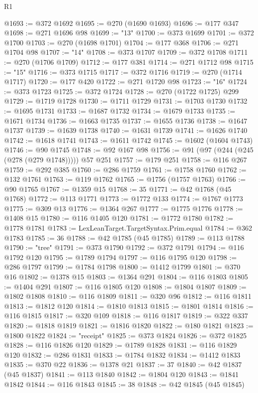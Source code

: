 \begin{lexlean}{R1}
\begin{coremodule}
@1693 := @372 @1692
@1695 := @270 (@1690 @1693)
@1696 := @177 @347
@1698 := @271 @1696 @98
@1699 := "13"
@1700 := @373 @1699
@1701 := @372 @1700
@1703 := @270 (@1698 @1701)
@1704 := @177 @368
@1706 := @271 @1704 @98
@1707 := "14"
@1708 := @373 @1707
@1709 := @372 @1708
@1711 := @270 (@1706 @1709)
@1712 := @177 @381
@1714 := @271 @1712 @98
@1715 := "15"
@1716 := @373 @1715
@1717 := @372 @1716
@1719 := @270 (@1714 @1717)
@1720 := @177 @420
@1722 := @271 @1720 @98
@1723 := "16"
@1724 := @373 @1723
@1725 := @372 @1724
@1728 := @270 (@1722 @1725) @299
@1729 := @1719 @1728
@1730 := @1711 @1729
@1731 := @1703 @1730
@1732 := @1695 @1731
@1733 := @1687 @1732
@1734 := @1679 @1733
@1735 := @1671 @1734
@1736 := @1663 @1735
@1737 := @1655 @1736
@1738 := @1647 @1737
@1739 := @1639 @1738
@1740 := @1631 @1739
@1741 := @1626 @1740
@1742 := @1618 @1741
@1743 := @1611 @1742
@1745 := @1602 (@1604 @1743)
@1746 := @90 @1745
@1748 := @92 @167 @98
@1756 := @91 (@97 (@244 (@245 (@278 (@279 @1748))))) @57 @251
@1757 := @179 @251
@1758 := @116 @267
@1759 := @292 @385
@1760 := @286 @1759
@1761 := @1758 @1760
@1762 := @132 @1761
@1763 := @119 @1762
@1765 := @1756 (@1757 @1763)
@1766 := @90 @1765
@1767 := @1359 @15
@1768 := 35
@1771 := @42 @1768 (@45 @1768)
@1772 := @113 @1771
@1773 := @1772 @133
@1774 := @1767 @1773
@1775 := @309 @13
@1776 := @1364 @267
@1777 := @1775 @1776
@1778 := @1408 @15
@1780 := @116 @1405 @120
@1781 := @1772 @1780
@1782 := @1778 @1781
@1783 := LexLeanTarget.TargetSyntax.Prim.equal
@1784 := @362 @1783
@1785 := 36
@1788 := @42 @1785 (@45 @1785)
@1789 := @113 @1788
@1790 := "tree"
@1791 := @373 @1790
@1792 := @372 @1791
@1794 := @116 @1792 @120
@1795 := @1789 @1794
@1797 := @116 @1795 @120
@1798 := @286 @1797
@1799 := @1784 @1798
@1800 := @1412 @1799
@1801 := @370 @16
@1802 := @1378 @15
@1803 := @1364 @291
@1804 := @116 @1803
@1805 := @1404 @291
@1807 := @116 @1805 @120
@1808 := @1804 @1807
@1809 := @1802 @1808
@1810 := @116 @1809
@1811 := @320 @96
@1812 := @116 @1811
@1813 := @1812 @120
@1814 := @1810 @1813
@1815 := @1801 @1814
@1816 := @116 @1815
@1817 := @320 @109
@1818 := @116 @1817
@1819 := @322 @337
@1820 := @1818 @1819
@1821 := @1816 @1820
@1822 := @180 @1821
@1823 := @1800 @1822
@1824 := "receipt"
@1825 := @373 @1824
@1826 := @372 @1825
@1828 := @116 @1826 @120
@1829 := @1789 @1828
@1831 := @116 @1829 @120
@1832 := @286 @1831
@1833 := @1784 @1832
@1834 := @1412 @1833
@1835 := @370 @22
@1836 := @1378 @21
@1837 := 37
@1840 := @42 @1837 (@45 @1837)
@1841 := @113 @1840
@1842 := @1804 @120
@1843 := @1841 @1842
@1844 := @116 @1843
@1845 := 38
@1848 := @42 @1845 (@45 @1845)

\end{coremodule}
\end{lexlean}
